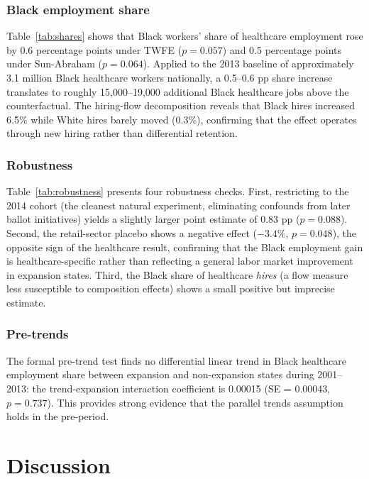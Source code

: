 \documentclass[12pt]{article}
\begin{document}


\subsubsection*{Black employment share} Table~\ref{tab:shares} shows that Black workers' share of healthcare employment rose by 0.6 percentage points under TWFE ($p = 0.057$) and 0.5 percentage points under Sun-Abraham ($p = 0.064$). Applied to the 2013 baseline of approximately 3.1 million Black healthcare workers nationally, a 0.5--0.6 pp share increase translates to roughly 15,000--19,000 additional Black healthcare jobs above the counterfactual. The hiring-flow decomposition reveals that Black hires increased 6.5\% while White hires barely moved (0.3\%), confirming that the effect operates through new hiring rather than differential retention.



\subsubsection*{Robustness} Table~\ref{tab:robustness} presents four robustness checks. First, restricting to the 2014 cohort (the cleanest natural experiment, eliminating confounds from later ballot initiatives) yields a slightly larger point estimate of 0.83 pp ($p = 0.088$). Second, the retail-sector placebo shows a negative effect ($-3.4\%$, $p = 0.048$), the opposite sign of the healthcare result, confirming that the Black employment gain is healthcare-specific rather than reflecting a general labor market improvement in expansion states. Third, the Black share of healthcare \textit{hires} (a flow measure less susceptible to composition effects) shows a small positive but imprecise estimate.

\subsubsection*{Pre-trends} The formal pre-trend test finds no differential linear trend in Black healthcare employment share between expansion and non-expansion states during 2001--2013: the trend-expansion interaction coefficient is 0.00015 (SE = 0.00043, $p = 0.737$). This provides strong evidence that the parallel trends assumption holds in the pre-period.

\section{Discussion}
\label{sec:discussion}
\end{document}
